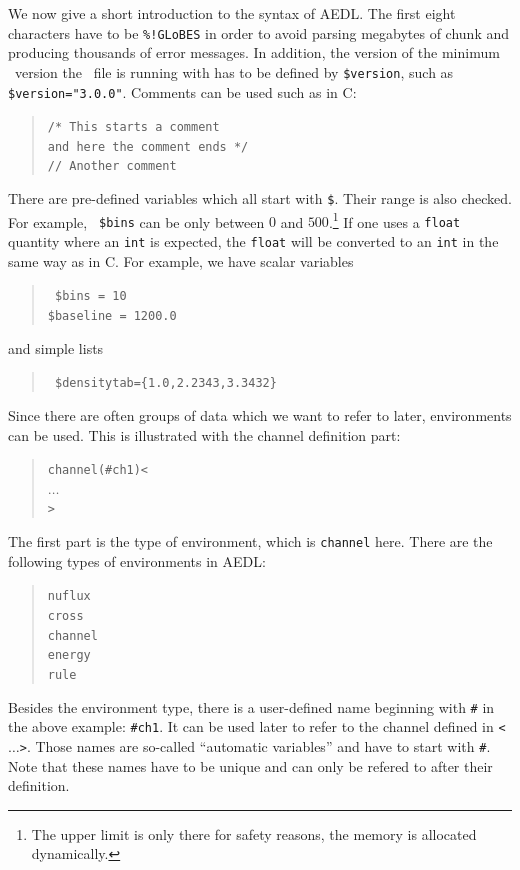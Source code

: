 We now give a short introduction to the syntax of AEDL.
 The first eight characters have to be {\tt \%!GLoBES}
in order to avoid parsing megabytes of chunk
 and producing thousands of error messages.  In addition, the version of the minimum
\GLOBES\ version the \AEDL\ file is running with has to be defined by {\tt \$version}, such as
{\tt \$version="3.0.0"}.
%
Comments can be used such as in C:
\begin{quote}
{\tt /* This starts a comment\\
 and here the comment ends */ \\
// Another comment
}
\end{quote}
There are pre-defined variables which all start with {\tt \$}. Their range
is also checked. For example,  {\tt 
\$bins} can be only between $0$ and $500$.\footnote{The upper limit is 
only there for safety reasons, the memory is allocated dynamically.} If one uses a {\tt float} quantity where  an {\tt int} is expected, the {\tt float} will be converted to an {\tt int} in the same way as in C.  For example, we have scalar variables
\begin{quote}
{\tt
\$bins = 10\\
\$baseline = 1200.0
}
\end{quote}
and simple lists
\begin{quote}
{\tt
\$densitytab=\{1.0,2.2343,3.3432\} 
}
\end{quote}
%
Since there are often groups of data which we want to refer to later,
environments can be used. This is illustrated 
with the channel definition part:
\begin{quote}
{\tt channel(\#ch1)<\\
\tb  $\ldots$\\
>
}
\end{quote}
The first part is the type of environment, which is {\tt channel} here. 
There are the following types of environments in AEDL:
\begin{quote}
{\tt nuflux\\
cross\\
channel\\
energy\\
rule
}
\end{quote}
Besides the environment type, there is a user-defined name 
beginning with {\tt \#}
in the above example: {\tt \#ch1}. It can be used later to refer to the 
channel defined in {\tt <$\ldots$>}. Those names are so-called 
``automatic variables'' and have to start with {\tt \#}. Note that these names have to be unique and can only be refered to after their definition.
